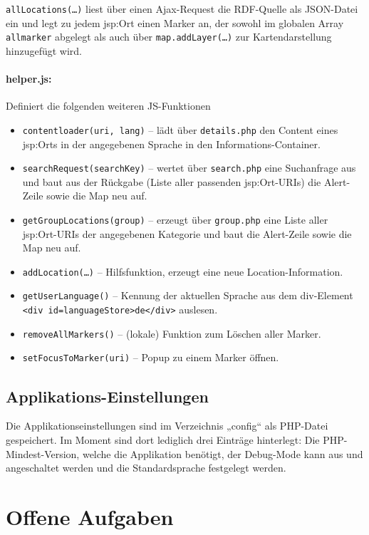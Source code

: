\documentclass[11pt,a4paper]{article}
\begin{document}
\texttt{allLocations(\dots)} liest über einen Ajax-Request die RDF-Quelle als
JSON-Datei ein und legt zu jedem jsp:Ort einen Marker an, der sowohl im
globalen Array \texttt{allmarker} abgelegt als auch über
\texttt{map.addLayer(\dots)} zur Kartendarstellung hinzugefügt wird. 

\paragraph{helper.js:}         
Definiert die folgenden weiteren JS-Funktionen
\begin{itemize}
\item \texttt{contentloader(uri, lang)} -- lädt über \texttt{details.php} den
  Content eines jsp:Orts in der angegebenen Sprache in den
  Informations-Container.
\item \texttt{searchRequest(searchKey)} -- wertet über \texttt{search.php} eine
  Suchanfrage aus und baut aus der Rückgabe (Liste aller passenden
  jsp:Ort-URIs) die Alert-Zeile sowie die Map neu auf.
\item \texttt{getGroupLocations(group)} -- erzeugt über \texttt{group.php} eine
  Liste aller jsp:Ort-URIs der angegebenen Kategorie und baut die Alert-Zeile
  sowie die Map neu auf.
\item \texttt{addLocation(\dots)} -- Hilfsfunktion, erzeugt eine neue
  Location-Information. 
\item \texttt{getUserLanguage()} -- Kennung der aktuellen Sprache aus dem
  div-Element\\ \texttt{<div id={\dq}languageStore{\dq}>de</div>} auslesen.
\item \texttt{removeAllMarkers()} -- (lokale) Funktion zum Löschen aller
  Marker.
\item \texttt{setFocusToMarker(uri)} -- Popup zu einem Marker öffnen.
\end{itemize}

\subsection{Applikations-Einstellungen}
Die Applikationseinstellungen sind im Verzeichnis „config“ als PHP-Datei
gespeichert. Im Moment sind dort lediglich drei Einträge hinterlegt: Die
PHP-Mindest-Version, welche die Applikation benötigt, der Debug-Mode kann aus
und angeschaltet werden und die Standardsprache festgelegt werden.

\section{Offene Aufgaben}
\end{document}
